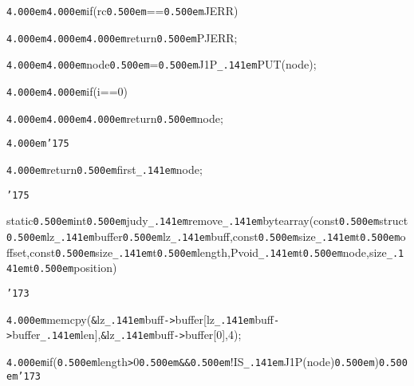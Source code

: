 \noindent
{}\hfill

\noindent
{}{\tt\mc \kern4.000em}{\tt\mc \kern4.000em}if(rc{\tt\mc \kern0.500em}=={\tt\mc \kern0.500em}JERR)

\noindent
{}{\tt\mc \kern4.000em}{\tt\mc \kern4.000em}{\tt\mc \kern4.000em}return{\tt\mc \kern0.500em}PJERR;

\noindent
{}\hfill

\noindent
{}{\tt\mc \kern4.000em}{\tt\mc \kern4.000em}{\tt *}node{\tt\mc \kern0.500em}={\tt\mc \kern0.500em}J1P{\tt\_\kern.141em}PUT({\tt *}node);

\noindent
{}{\tt\mc \kern4.000em}{\tt\mc \kern4.000em}if(i==0)

\noindent
{}{\tt\mc \kern4.000em}{\tt\mc \kern4.000em}{\tt\mc \kern4.000em}return{\tt\mc \kern0.500em}{\tt *}node;

\noindent
{}{\tt\mc \kern4.000em}{\tt\char'175}

\noindent
{}{\tt\mc \kern4.000em}return{\tt\mc \kern0.500em}{\tt *}first{\tt\_\kern.141em}node;

\noindent
{}{\tt\char'175}

\noindent
{}\hfill

\noindent
{}\hfill

\noindent
{}static{\tt\mc \kern0.500em}int{\tt\mc \kern0.500em}judy{\tt\_\kern.141em}remove{\tt\_\kern.141em}bytearray(const{\tt\mc \kern0.500em}struct{\tt\mc \kern0.500em}lz{\tt\_\kern.141em}buffer{\tt *}{\tt\mc \kern0.500em}lz{\tt\_\kern.141em}buff,const{\tt\mc \kern0.500em}size{\tt\_\kern.141em}t{\tt\mc \kern0.500em}offset,const{\tt\mc \kern0.500em}size{\tt\_\kern.141em}t{\tt\mc \kern0.500em}length,Pvoid{\tt\_\kern.141em}t{\tt *}{\tt\mc \kern0.500em}node,size{\tt\_\kern.141em}t{\tt\mc \kern0.500em}position)

\noindent
{}{\tt\char'173}

\noindent
{}\hfill

\noindent
{}{\tt\mc \kern4.000em}memcpy({\tt\&}lz{\tt\_\kern.141em}buff{\tt -}{\tt >}buffer[lz{\tt\_\kern.141em}buff{\tt -}{\tt >}buffer{\tt\_\kern.141em}len],{\tt\&}lz{\tt\_\kern.141em}buff{\tt -}{\tt >}buffer[0],4);

\noindent
{}\hfill

\noindent
{}\hfill

\noindent
{}{\tt\mc \kern4.000em}if({\tt\mc \kern0.500em}length{\tt >}0{\tt\mc \kern0.500em}{\tt\&}{\tt\&}{\tt\mc \kern0.500em}!IS{\tt\_\kern.141em}J1P({\tt *}node){\tt\mc \kern0.500em}){\tt\mc \kern0.500em}{\tt\char'173}

